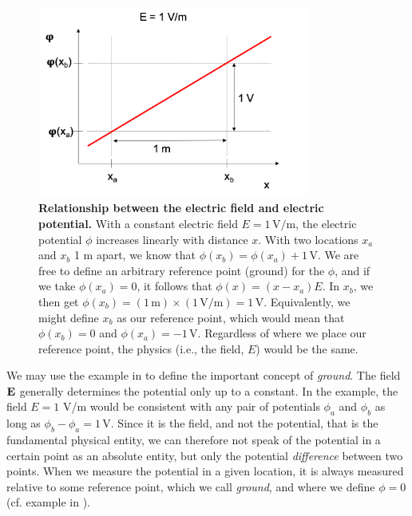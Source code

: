 \begin{figure}[!ht]
\begin{center}
\includegraphics[width=0.8\textwidth]{Figures/Basics/Ground.png}
\end{center}
\caption{\textbf{Relationship between the electric field and electric potential.} With a constant electric field $E = 1\,\si{\volt\per\metre}$, the electric potential $\phi$ increases linearly with distance $x$. With two locations $x_a$ and $x_b$ 1 \si{\metre} apart, we know that $\phi(x_b) = \phi(x_a) + 1\,\si{\volt}$. We are free to define an arbitrary reference point (ground) for the $\phi$, and if we take $\phi(x_a) = 0$, it follows that $\phi(x) = (x-x_a)E$. In $x_b$, we then get $\phi(x_b)=(1\,\si{\metre})\times(1\, \si{\volt\per\metre}) =1\,\si{\volt}$. Equivalently, we might define $x_b$ as our reference point, which would mean that $\phi(x_b) = 0$ and $\phi(x_a) = -1\,\si{\volt}$. Regardless of where we place our reference point, the physics (i.e., the field, $E$) would be the same.
}
\label{fig:Basics:Ground}
\end{figure}

We may use the example in  to define the important concept of \textit{ground}. The field ${\bf E}$ generally determines the potential only up to a constant. In the example, the field $E = 1$ V/m would be consistent with any pair of potentials $\phi_a$ and $\phi_b$ as long as $\phi_b - \phi_a =  1 \,\si{\volt}$. Since it is the field, and not the potential, that is the fundamental physical entity, we can therefore not speak of the potential in a certain point as an absolute entity, but only the potential \textit{difference} between two points. When we measure the potential in a given location, it is always measured relative to some reference point, which we  call \textit{ground}, and where we define $\phi = 0$ (cf. example in ). 


